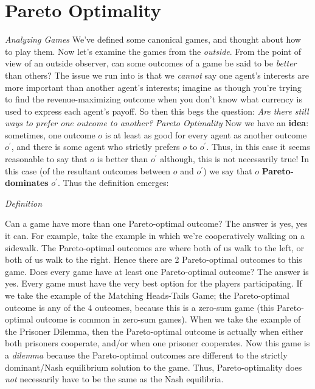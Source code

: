 \documentclass{article}
\begin{document}
\section{Pareto Optimality}

\emph{Analyzing Games}
\vskip 0.1in
We've defined some canonical games, and thought about how to play them. Now let's examine the games from the \emph{outside}. From the point of view of an outside observer, can some outcomes of a game be said to be \emph{better} than others? The issue we run into is that we \emph{cannot} say one agent's interests are more important than another agent's interests; imagine as though you're trying to find the revenue-maximizing outcome when you don't know what currency is used to express each agent's payoff. So then this begs the question: \emph{Are there still ways to prefer one outcome to another?}
\vskip 0.1in
\emph{Pareto Optimality}
\vskip 0.1in
Now we have an \textbf{idea}: sometimes, one outcome \(o\) is at least as good for every agent as another outcome \(o^{'}\), and there is some agent who strictly prefers \(o\) to \(o^{'}\). Thus, in this case it seems reasonable to say that \(o\) is better than \(o^{'}\) although, this is not necessarily true! In this case (of the resultant outcomes between \(o\) and \(o^{'}\)) we say that \(o\) \textbf{Pareto-dominates} \(o^{'}\). Thus the definition emerges:
\begin{center}
    \emph{Definition}
\end{center}
\vskip 0.05in
Can a game have more than one Pareto-optimal outcome? The answer is yes, yes it can. For example, take the example in which we're cooperatively walking on a sidewalk. The Pareto-optimal outcomes are where both of us walk to the left, or both of us walk to the right. Hence there are 2 Pareto-optimal outcomes to this game. Does every game have at least one Pareto-optimal outcome? The answer is yes. Every game must have the very best option for the players participating. 
\vskip 0.1in
If we take the example of the Matching Heads-Tails Game; the Pareto-optimal outcome is any of the 4 outcomes, because this is a zero-sum game (this Pareto-optimal outcome is common in zero-sum games). When we take the example of the Prisoner Dilemma, then the Pareto-optimal outcome is actually when either both prisoners cooperate, and/or when one prisoner cooperates. Now this game is a \emph{dilemma} because the Pareto-optimal outcomes are different to the strictly dominant/Nash equilibrium solution to the game. Thus, Pareto-optimality does \emph{not} necessarily have to be the same as the Nash equilibria. 
\end{document}
